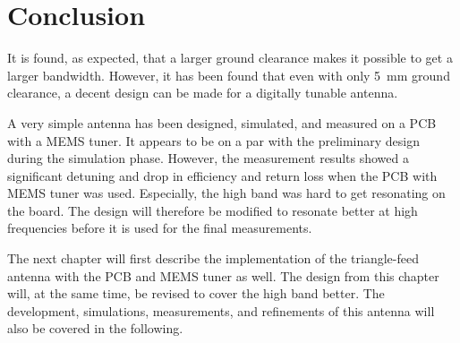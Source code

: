 \section{Conclusion}
It is found, as expected, that a larger ground clearance makes it possible to get a larger bandwidth. However, it has been found that even with only \SI{5}{mm} ground clearance, a decent design can be made for a digitally tunable antenna.

A very simple antenna has been designed, simulated, and measured on a PCB with a MEMS tuner. It appears to be on a par with the preliminary design during the simulation phase. However, the measurement results showed a significant detuning and drop in efficiency and return loss when the PCB with MEMS tuner was used. Especially, the high band was hard to get resonating on the board. The design will therefore be modified to resonate better at high frequencies before it is used for the final measurements.

The next chapter will first describe the implementation of the triangle-feed antenna with the PCB and MEMS tuner as well. The design from this chapter will, at the same time, be revised to cover the high band better. The development, simulations, measurements, and refinements of this antenna will also be covered in the following.
